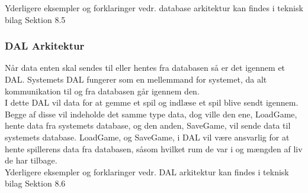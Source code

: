 \noindent Yderligere eksempler og forklaringer vedr. database arkitektur kan findes i teknisk bilag Sektion 8.5

\subsubsection{DAL Arkitektur}
Når data enten skal sendes til eller hentes fra databasen så er det igennem et DAL. Systemets DAL fungerer som en mellemmand for systemet, da alt kommunikation til og fra databasen går igennem den.\\
\noindent I dette DAL vil data for at gemme et spil og indlæse et spil blive sendt igennem. Begge af disse vil indeholde det samme type data, dog ville den ene, LoadGame, hente data fra systemets database, og den anden, SaveGame, vil sende data til systemets database. 
LoadGame, og SaveGame, i DAL vil være ansvarlig for at hente spillerens data fra databasen, såsom hvilket rum de var i og mængden af liv de har tilbage.\\

\noindent Yderligere eksempler og forklaringer vedr. DAL arkitektur kan findes i teknisk bilag Sektion 8.6